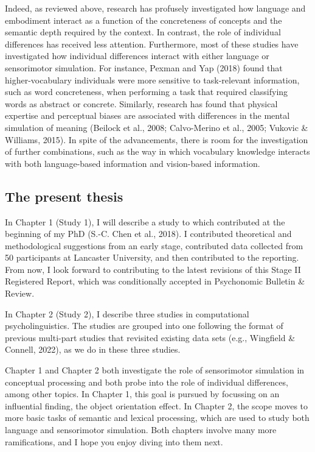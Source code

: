 \documentclass[
  12pt,
  man,floatsintext]{apa7}
\begin{document}
Indeed, as reviewed above, research has profusely investigated how language and embodiment interact as a function of the concreteness of concepts and the semantic depth required by the context. In contrast, the role of individual differences has received less attention. Furthermore, most of these studies have investigated how individual differences interact with either language or sensorimotor simulation. For instance, Pexman and Yap (2018) found that higher-vocabulary individuals were more sensitive to task-relevant information, such as word concreteness, when performing a task that required classifying words as abstract or concrete. Similarly, research has found that physical expertise and perceptual biases are associated with differences in the mental simulation of meaning (Beilock et al., 2008; Calvo-Merino et al., 2005; Vukovic \& Williams, 2015). In spite of the advancements, there is room for the investigation of further combinations, such as the way in which vocabulary knowledge interacts with both language-based information and vision-based information.

\hypertarget{the-present-thesis}{%
\subsection{The present thesis}\label{the-present-thesis}}

In Chapter 1 (Study 1), I will describe a study to which contributed at the beginning of my PhD (S.-C. Chen et al., 2018). I contributed theoretical and methodological suggestions from an early stage, contributed data collected from 50 participants at Lancaster University, and then contributed to the reporting. From now, I look forward to contributing to the latest revisions of this Stage II Registered Report, which was conditionally accepted in Psychonomic Bulletin \& Review.

In Chapter 2 (Study 2), I describe three studies in computational psycholinguistics. The studies are grouped into one following the format of previous multi-part studies that revisited existing data sets (e.g., Wingfield \& Connell, 2022), as we do in these three studies.

Chapter 1 and Chapter 2 both investigate the role of sensorimotor simulation in conceptual processing and both probe into the role of individual differences, among other topics. In Chapter 1, this goal is pursued by focussing on an influential finding, the object orientation effect. In Chapter 2, the scope moves to more basic tasks of semantic and lexical processing, which are used to study both language and sensorimotor simulation. Both chapters involve many more ramifications, and I hope you enjoy diving into them next.
\end{document}
